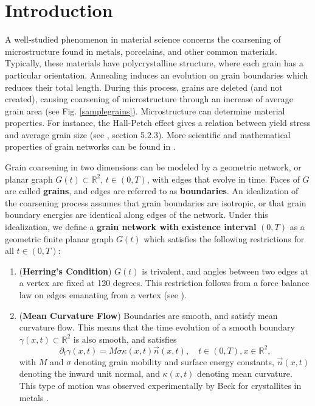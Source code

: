 \section{Introduction}\label{introduct}
A well-studied phenomenon in material science concerns the coarsening of microstructure found in metals, porcelains, and other common materials.  Typically, these materials have polycrystalline structure, where each grain has a particular orientation.  Annealing induces an evolution on grain boundaries which reduces their total length.  During this process, grains are deleted (and not created), causing coarsening of microstructure through an increase of average grain area (see Fig. \ref{samplegrains}).  Microstructure can determine material properties. For instance, the Hall-Petch effect gives a relation between yield stress and average grain size (see \cite{anderson2005fracture}, section 5.2.3).     More scientific and  mathematical properties of grain networks can be found in \cite{fradkov1994two,thompson2001grain}.


 
 
Grain coarsening in two dimensions  can be modeled by a geometric network, or planar graph $G(t) \subset \mathbb{R}^2$, $t\in (0,T)$, with edges  that evolve in time. Faces of $G$ are called \textbf{grains}, and edges are referred to as \textbf{boundaries}. An idealization of the coarsening process assumes that grain boundaries are isotropic, or that grain boundary energies are identical along edges of the network. Under this idealization, we  define a \textbf{grain network with existence interval} $(0,T)$  as a geometric finite planar graph $G(t)$ which satisfies the
following restrictions for all $t\in(0,T)$:



\begin{enumerate}
\item (\textbf{Herring's Condition})   $G(t)$ is trivalent, and angles between two edges at a vertex are fixed at 120 degrees.
This restriction follows from a force balance law on edges  emanating from a vertex (see \cite{herring1999surface}).\item (\textbf{Mean Curvature Flow}) Boundaries are smooth, and satisfy mean curvature flow.  This means that the time evolution of a smooth boundary $\gamma(x,t)\subset \mathbb R^2$ is also smooth, and satisfies 
 \begin{equation} \label{curveflow}
\partial_t \gamma(x,t) = M\sigma \kappa(x,t)  \vec n(x,t), \quad t\in(0,T), x \in \mathbb{R}^2,
\end{equation}
with $M$ and $\sigma$ denoting grain mobility and surface energy constants, $\vec n(x,t)$ denoting the inward unit normal, and $\kappa(x,t)$ denoting mean curvature. This type of motion was observed experimentally by Beck for crystallites in metals \cite{bec52}.
\end{enumerate}
     


